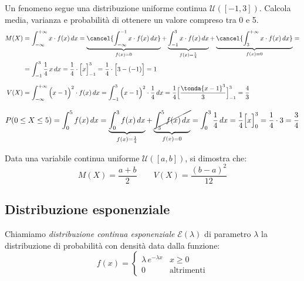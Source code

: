 \begin{esempio} Un fenomeno segue una distribuzione uniforme continua \(\mathcal{U} ([-1,3])\). Calcola media, varianza e probabilità di ottenere un valore compreso tra 0 e 5.
\[\begin{split}M(X) &=  \int_{-\infty}^{+\infty} x\cdot f(x) \,dx = \underbrace{\cancel{\int_{-\infty}^{-1} x\cdot f(x) \,dx}}_{f(x)=0}+\underbrace{\int_{-1}^{3} x\cdot f(x) \,dx}_{f(x) = \frac{1}{4}}+ \underbrace{\cancel{\int_{3}^{+\infty} x\cdot f(x) \,dx}}_{f(x)=0} = \\ &=\int_{-1}^{3}  \frac{1}{4}\, x \,dx =\frac{1}{4} \cdot \Big[   x \Big]_{-1}^3 = \frac{1}{4}\cdot \Big[   3-(-1) \Big] = 1\\[6pt]
V(X) &=  \int_{-\infty}^{+\infty}\Big(x-1\Big)^2\cdot f(x) \,dx = \int_{-1}^{3}\Big(x-1\Big)^2\cdot \frac{1}{4} \,dx= \frac{1}{4} \Big[\frac{\tonda{x-1}^3}{3}\Big]_{-1}^3 = \frac{4}{3}  \\[6pt]
\end{split}\]
\[P(0\leq X \leq 5) =  \int_{0}^{5}  f(x) \,dx =  \underbrace{\int_{0}^{3} f(x) \,dx}_{f(x) = \frac{1}{4}}+ \underbrace{\cancel{\int_{3}^{5} f(x) \,dx}}_{f(x)=0} = \int_0^3 \frac{1}{4} \,dx = \frac{1}{4} \Big[x\Big]_0^3 = \frac{1}{4} \cdot 3 = \frac{3}{4}\]
\end{esempio}

\begin{proprieta} Data una variabile continua uniforme \(\mathcal{U}([a,b])\), si dimostra che: 
\[\boxed{M(X) =\dfrac{a+b}{2}} \qquad \boxed{V(X) = \dfrac{(b-a)^2}{12}}\]
\end{proprieta}


\subsection{Distribuzione esponenziale}

\begin{definizione} Chiamiamo \emph{distribuzione continua esponenziale} \(\mathcal{E}(\lambda)\) di parametro \(\lambda\) la distribuzione di probabilità con densità data dalla funzione:
\[f(x) = \begin{cases} \lambda \, e^{-\lambda x} & x \geq 0 \\
0 & \text{altrimenti}\end{cases}\]
\end{definizione}

